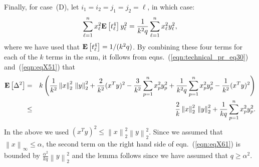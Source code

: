 \documentclass[11pt]{article}
\newcommand{\Expect}[1]{\mbox{}{\bf{E}}\left[#1\right]}
\newcommand{\VTTNormS}[1]{\mbox{}\left\|#1\right\|_2^2}
\newcommand{\VINorm }[1]{\mbox{}\left\|#1\right\|_{\infty}  }
\begin{document}
Finally, for case~(D), let $i_1=i_2=j_1=j_2=\ell$, in which case:
$$
\sum_{\ell=1}^{n} x_{\ell}^2\Expect{t_{\ell}^4}y_{\ell}^2
   = \frac{1}{k^2q} \sum_{\ell=1}^{n} x_{\ell}^2y_{\ell}^2   ,
$$
where we have used that $\Expect{t_{\ell}^4}=1/(k^2q)$.
By combining these four terms for each of the $k$ terms in the sum, it follows
from eqns.~(\ref{eqn:technical_pr_eq30}) and~(\ref{eqn:eqX51}) that
\begin{eqnarray}
\nonumber
\Expect{\Delta^2}
   &=& k\left( \frac{1}{k^2}\VTTNormS{x}\VTTNormS{y}
             + \frac{2}{k^2}(x^Ty)^2
             - \frac{3}{k^2} \sum_{p=1}^n x_p^2 y_p^2
             + \frac{1}{k^2q}\sum_{p=1}^n x_p^2 y_p^2
             - \frac{1}{k^2}(x^Ty)^2
        \right)     \\
\label{eqn:eqX61}
   &\leq& \frac{2}{k}\VTTNormS{x}\VTTNormS{y}
        + \frac{1}{kq} \sum_{p=1}^n x_p^2 y_p^2.
\end{eqnarray}
In the above we used $(x^Ty)^2 \le \VTTNormS{x}\VTTNormS{y}$.
Since we assumed that $\VINorm{x}\le\alpha$, the second term on the right
hand side of eqn.~(\ref{eqn:eqX61}) is bounded by
$\frac{\alpha^2}{kq}\VTTNormS{y}$ and the lemma follows since we have
assumed that $q \ge \alpha^2$.
\end{document}
